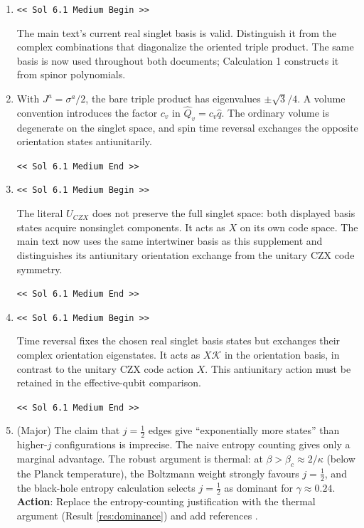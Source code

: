 \documentclass[11pt,a4paper]{article}
\theoremstyle{definition}
\newcommand{\GPTBegin}{\par\noindent\textcolor{GPTMarker}{\texttt{\textless\textless{} Sol 6.1 Medium Begin \textgreater\textgreater}}\par}
\newcommand{\GPTEnd}{\par\noindent\textcolor{GPTMarker}{\texttt{\textless\textless{} Sol 6.1 Medium End \textgreater\textgreater}}\par}
\begin{document}
\begin{enumerate}
\item[\textbf{C3a}] \GPTBegin{} The main text's current real singlet basis is valid.
    Distinguish it from the complex combinations that diagonalize the
    oriented triple product. The same basis is now used throughout both documents;
    Calculation 1 constructs it from spinor polynomials.

  \item[\textbf{C3b}] With $J^a=\sigma^a/2$, the bare triple product has
    eigenvalues $\pm\sqrt3/4$. A volume convention introduces the factor
    $c_v$ in $\hat Q_v=c_v\hat q$. The ordinary volume is degenerate on
    the singlet space, and spin time reversal exchanges the opposite
    orientation states antiunitarily.



  \GPTEnd{}

\item[\textbf{M6a}] \GPTBegin{}
    The literal $U_{CZX}$ does not preserve the full singlet space:
    both displayed basis states acquire nonsinglet components.
    It acts as $X$ on its own code space. The main text now uses the same
    intertwiner basis as this supplement and distinguishes its antiunitary
    orientation exchange from the unitary CZX code symmetry.
    \GPTEnd{}

  \item[\textbf{M6b}] \GPTBegin{}
    Time reversal fixes the chosen real singlet basis states but exchanges
    their complex orientation eigenstates. It acts as $X\mathcal K$ in
    the orientation basis, in contrast to the unitary CZX code action $X$.
    This antiunitary action must be retained in the effective-qubit comparison.
    \GPTEnd{}

  \item[\textbf{M9}] (Major) The claim that $j=\tfrac{1}{2}$ edges give
    ``exponentially more states'' than higher-$j$ configurations is
    imprecise.  The naive entropy counting gives only a marginal advantage.
    The robust argument is thermal: at $\beta > \beta_c\approx 2/\kappa$
    (below the Planck temperature), the Boltzmann weight strongly favours
    $j=\tfrac{1}{2}$, and the black-hole entropy calculation selects
    $j=\tfrac{1}{2}$ as dominant for $\gamma\approx 0.24$.
    \textbf{Action}: Replace the entropy-counting justification with the
    thermal argument (Result \ref{res:dominance}) and add references
    \cite{Meissner2004BlackHoleEntropy,Domagala2004Black}.
\end{enumerate}
\end{document}
